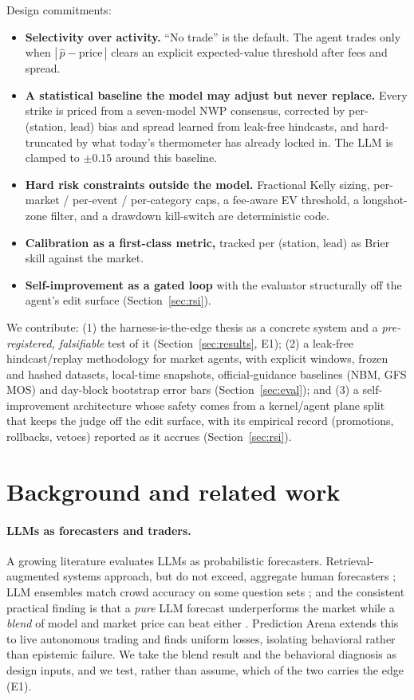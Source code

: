 \documentclass[sigconf,review,anonymous]{acmart}
\begin{document}
Design commitments:
\begin{itemize}
\item \textbf{Selectivity over activity.} ``No trade'' is the default. The agent
trades only when $|\,\hat{p}-\text{price}\,|$ clears an explicit expected-value
threshold after fees and spread.
\item \textbf{A statistical baseline the model may adjust but never replace.}
Every strike is priced from a seven-model NWP consensus, corrected by
per-(station, lead) bias and spread learned from leak-free hindcasts, and
hard-truncated by what today's thermometer has already locked in. The LLM is
clamped to $\pm 0.15$ around this baseline.
\item \textbf{Hard risk constraints outside the model.} Fractional Kelly sizing,
per-market / per-event / per-category caps, a fee-aware EV threshold, a
longshot-zone filter, and a drawdown kill-switch are deterministic code.
\item \textbf{Calibration as a first-class metric,} tracked per (station, lead)
as Brier skill against the market.
\item \textbf{Self-improvement as a gated loop} with the evaluator structurally
off the agent's edit surface (Section~\ref{sec:rsi}).
\end{itemize}

We contribute: (1) the harness-is-the-edge thesis as a concrete system and a
\emph{pre-registered, falsifiable} test of it (Section~\ref{sec:results}, E1);
(2) a leak-free hindcast/replay methodology for market agents, with explicit
windows, frozen and hashed datasets, local-time snapshots, official-guidance
baselines (NBM, GFS MOS) and day-block bootstrap error bars
(Section~\ref{sec:eval}); and (3) a self-improvement architecture whose safety
comes from a kernel/agent plane split that keeps the judge off the edit
surface, with its empirical record (promotions, rollbacks, vetoes) reported as
it accrues (Section~\ref{sec:rsi}).

\section{Background and related work}

\paragraph{LLMs as forecasters and traders.} A growing literature evaluates
LLMs as probabilistic forecasters. Retrieval-augmented systems approach, but
do not exceed, aggregate human forecasters \cite{halawi2024}; LLM ensembles
match crowd accuracy on some question sets \cite{schoenegger2024}; and the
consistent practical finding is that a \emph{pure} LLM forecast underperforms
the market while a \emph{blend} of model and market price can beat either
\cite{blend}. Prediction Arena \cite{predarena} extends this to live
autonomous trading and finds uniform losses, isolating behavioral rather than
epistemic failure. We take the blend result and the behavioral diagnosis as
design inputs, and we test, rather than assume, which of the two carries the
edge (E1).
\end{document}
